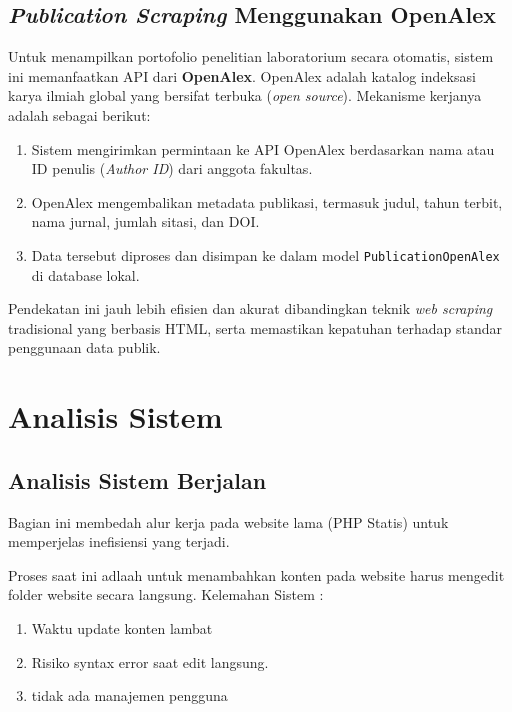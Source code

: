 \subsection{\textit{Publication Scraping} Menggunakan OpenAlex}
Untuk menampilkan portofolio penelitian laboratorium secara otomatis, sistem ini memanfaatkan API dari \textbf{OpenAlex}. OpenAlex adalah katalog indeksasi karya ilmiah global yang bersifat terbuka (\textit{open source}).
Mekanisme kerjanya adalah sebagai berikut:
\begin{enumerate}
    \item Sistem mengirimkan permintaan ke API OpenAlex berdasarkan nama atau ID penulis (\textit{Author ID}) dari anggota fakultas.
    \item OpenAlex mengembalikan metadata publikasi, termasuk judul, tahun terbit, nama jurnal, jumlah sitasi, dan DOI.
    \item Data tersebut diproses dan disimpan ke dalam model \texttt{PublicationOpenAlex} di database lokal.
\end{enumerate}
Pendekatan ini jauh lebih efisien dan akurat dibandingkan teknik \textit{web scraping} tradisional yang berbasis HTML, serta memastikan kepatuhan terhadap standar penggunaan data publik.

\section{Analisis Sistem}
\subsection{Analisis Sistem Berjalan}
Bagian ini membedah alur kerja pada website lama (PHP Statis) untuk memperjelas inefisiensi yang terjadi.

Proses saat ini adlaah untuk menambahkan konten pada website harus mengedit folder website secara langsung. 
Kelemahan Sistem :
\begin{enumerate}
    \item Waktu update konten lambat
    \item Risiko syntax error saat edit langsung.
    \item tidak ada manajemen pengguna
\end{enumerate}

